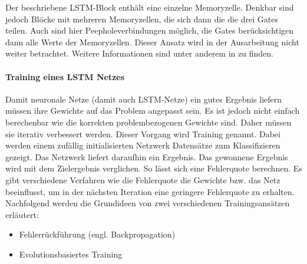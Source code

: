 Der beschriebene \ac{LSTM}-Block enthält eine einzelne Memoryzelle. Denkbar sind
jedoch Blöcke mit mehreren Memoryzellen, die sich dann die die drei Gates
teilen. Auch sind hier Peepholeverbindungen möglich, die Gates berücksichtigen
dann alle Werte der Memoryzellen. Dieser Ansatz wird in der Ausarbeitung nicht
weiter betrachtet. Weitere Informationen sind unter anderem in \cite{GERS2001}
zu finden.

\paragraph{Training eines \ac{LSTM} Netzes}
Damit neuronale Netze (damit auch \ac{LSTM}-Netze) ein gutes Ergebnis liefern
müssen ihre Gewichte auf das Problem angepasst sein. Es ist jedoch nicht einfach
berechenbar wie die korrekten problembezogenen Gewichte sind. Daher müssen sie
iterativ verbessert werden. Dieser Vorgang wird Training genannt. Dabei werden
einem zufällig initialisierten Netzwerk Datensätze zum Klassifizieren gezeigt.
Das Netzwerk liefert daraufhin ein Ergebnis. Das gewonnene Ergebnis wird mit dem
Zielergebnis verglichen. So lässt sich eine Fehlerquote berechnen. Es gibt
verschiedene Verfahren wie die Fehlerquote die Gewichte bzw. das Netz
beeinflusst, um in der nächsten Iteration eine geringere Fehlerquote zu
erhalten. Nachfolgend werden die Grundideen von zwei verschiedenen
Trainingsansätzen erläutert:
\begin{itemize}
	\item Fehlerrückführung (engl. Backpropagation)
	\item Evolutionsbasiertes Training
\end{itemize}


